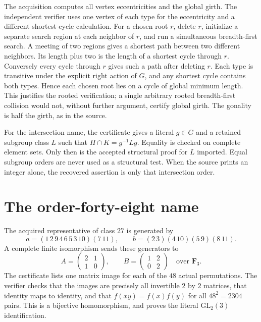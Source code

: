 \documentclass[11pt]{article}
\begin{document}
The acquisition computes all vertex eccentricities and the global girth.
The independent verifier uses one vertex of each type for the eccentricity
and a different shortest-cycle calculation. For a chosen root $r$, delete
$r$, initialize a separate search region at each neighbor of $r$, and run
a simultaneous breadth-first search. A meeting of two regions gives a
shortest path between two different neighbors. Its length plus two is the
length of a shortest cycle through $r$. Conversely every cycle through $r$
gives such a path after deleting $r$. Each type is transitive under the
explicit right action of $G$, and any shortest cycle contains both types.
Hence each chosen root lies on a cycle of global minimum length. This
justifies the rooted verification; a single arbitrary rooted breadth-first
collision would not, without further argument, certify global girth.
The gonality is half the girth, as in the source.

For the intersection name, the certificate gives a literal $g\in G$ and a
retained subgroup class $L$ such that $H\cap K=g^{-1}Lg$. Equality is checked
on complete element sets. Only then is the accepted structural proof for
$L$ imported. Equal subgroup orders are never used as a structural test.
When the source prints an integer alone, the recovered assertion is only
that intersection order.

\section{The order-forty-eight name}
The acquired representative of class $27$ is generated by
\[
 a=(1\,2\,9\,4\,6\,5\,3\,10)(7\,11),\qquad
 b=(2\,3)(4\,10)(5\,9)(8\,11).
\]
A complete finite isomorphism sends these generators to
\[
 A=\begin{pmatrix}2&1\\1&0\end{pmatrix},\qquad
 B=\begin{pmatrix}1&2\\0&2\end{pmatrix}
       \quad\text{over }\mathbf F_3.
\]
The certificate lists one matrix image for each of the $48$ actual
permutations. The verifier checks that the images are precisely all
invertible $2$ by $2$ matrices, that identity maps to identity, and that
$f(xy)=f(x)f(y)$ for all $48^2=2304$ pairs. This is a bijective homomorphism,
and proves the literal $\mathrm{GL}_2(3)$ identification.
\end{document}
